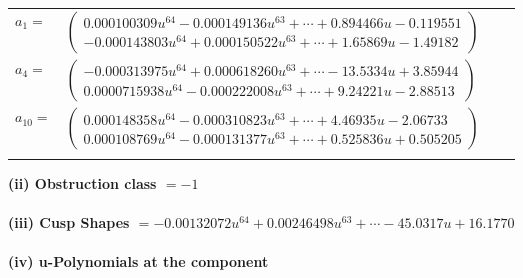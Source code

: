 \documentclass[1p]{elsarticle_modified}
\theoremstyle{definition}
\begin{document}
\begin{tabular}{m{7pt} m{180pt} m{7pt} m{180pt} }
\flushright $a_{1}=$&$\begin{pmatrix}0.000100309 u^{64}-0.000149136 u^{63}+\cdots+0.894466 u-0.119551\\-0.000143803 u^{64}+0.000150522 u^{63}+\cdots+1.65869 u-1.49182\end{pmatrix}$ \\
\flushright $a_{4}=$&$\begin{pmatrix}-0.000313975 u^{64}+0.000618260 u^{63}+\cdots-13.5334 u+3.85944\\0.0000715938 u^{64}-0.000222008 u^{63}+\cdots+9.24221 u-2.88513\end{pmatrix}$ \\
\flushright $a_{10}=$&$\begin{pmatrix}0.000148358 u^{64}-0.000310823 u^{63}+\cdots+4.46935 u-2.06733\\0.000108769 u^{64}-0.000131377 u^{63}+\cdots+0.525836 u+0.505205\end{pmatrix}$\\&\end{tabular}
\flushleft \textbf{(ii) Obstruction class $= -1$}\\~\\
\flushleft \textbf{(iii) Cusp Shapes $= -0.00132072 u^{64}+0.00246498 u^{63}+\cdots-45.0317 u+16.1770$}\\~\\
\newpage\renewcommand{\arraystretch}{1}
\flushleft \textbf{(iv) u-Polynomials at the component}\newline \\
\end{document}
